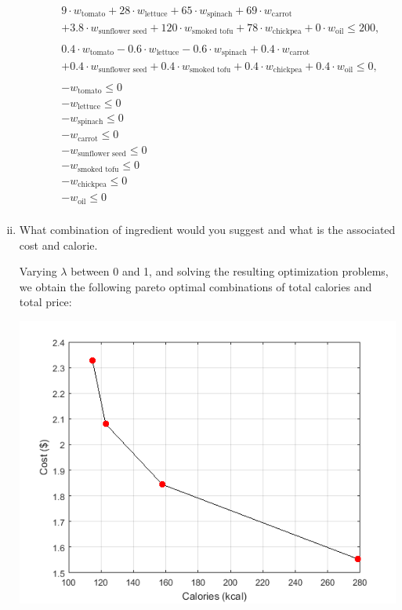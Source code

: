 \documentclass[../main.tex]{subfiles}
\begin{document}
\begin{enumerate}[i.]
\begin{equation*}
\begin{aligned}
			& & & 9 \cdot w_{\text{tomato}} + 28 \cdot  w_{\text{lettuce}} + 65 \cdot w_{\text{spinach}} + 69  \cdot w_{\text{carrot}} \\
			& & & + 3.8 \cdot w_{\text{sunflower seed}} + 120 \cdot w_{\text{smoked tofu}} + 78 \cdot w_{\text{chickpea}} + 0 \cdot w_{\text{oil}} \leq 200, \\ \\
			& & & 0.4 \cdot w_{\text{tomato}} - 0.6 \cdot  w_{\text{lettuce}} - 0.6 \cdot w_{\text{spinach}} + 0.4 \cdot w_{\text{carrot}} \\
			& & & + 0.4 \cdot w_{\text{sunflower seed}} + 0.4 \cdot w_{\text{smoked tofu}} + 0.4 \cdot w_{\text{chickpea}} + 0.4 \cdot w_{\text{oil}} \leq 0, \\ \\
			& & & - w_{\text{tomato}} \leq 0 \\
			& & & - w_{\text{lettuce}} \leq 0 \\
			& & & - w_{\text{spinach}} \leq 0 \\
			& & & - w_{\text{carrot}} \leq 0 \\
			& & & - w_{\text{sunflower seed}} \leq 0 \\
			& & & - w_{\text{smoked tofu}} \leq 0 \\
			& & & - w_{\text{chickpea}} \leq 0 \\
			& & & - w_{\text{oil}} \leq 0 \\
		\end{aligned}
	\end{equation*}

	\item What combination of ingredient would you suggest and what is the associated cost and calorie.

	Varying $\lambda$ between 0 and 1, and solving the resulting optimization problems, we obtain the following pareto optimal combinations of total calories and total price:

	\begin{center}
		\includegraphics{../problem_two/problem2_partC}
	\end{center}


\end{enumerate}
\end{document}
